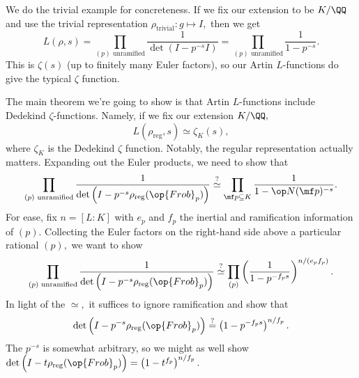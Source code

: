 We do the trivial example for concreteness. If we fix our extension to be $K/\QQ$ and use the trivial representation $\rho_{\text{trivial}}:g\mapsto I,$ then we get
\[L(\rho,s)=\prod_{(p)\text{ unramified}}\frac1{\det(I-p^{-s}I)}=\prod_{(p)\text{ unramified}}\frac1{1-p^{-s}}.\]
This is $\zeta(s)$ (up to finitely many Euler factors), so our Artin $L$-functions do give the typical $\zeta$ function.

The main theorem we're going to show is that Artin $L$-functions include Dedekind $\zeta$-functions. Namely, if we fix our extension $K/\QQ,$
\[L(\rho_{\text{reg}},s)\simeq\zeta_K(s),\]
where $\zeta_K$ is the Dedekind $\zeta$ function. Notably, the regular representation actually matters. Expanding out the Euler products, we need to show that
\[\prod_{(p)\text{ unramified}}\frac1{\det\left(I-p^{-s}\rho_{\text{reg}}(\op{Frob}_p)\right)}\stackrel?\simeq\prod_{\mf p\subseteq K}\frac1{1-\op N(\mf p)^{-s}}.\]
For ease, fix $n=[L:K]$ with $e_p$ and $f_p$ the inertial and ramification information of $(p).$ Collecting the Euler factors on the right-hand side above a particular rational $(p),$ we want to show
\[\prod_{(p)\text{ unramified}}\frac1{\det\left(I-p^{-s}\rho_{\text{reg}}(\op{Frob}_p)\right)}\stackrel?\simeq\prod_{(p)}\left(\frac1{1-p^{-f_ps}}\right)^{n/(e_pf_p)}.\]
In light of the $\simeq,$ it suffices to ignore ramification and show that
\[\det\left(I-p^{-s}\rho_{\text{reg}}(\op{Frob}_p)\right)\stackrel?=\left(1-p^{-f_ps}\right)^{n/f_p}.\]
The $p^{-s}$ is somewhat arbitrary, so we might as well show $\det\left(I-t\rho_{\text{reg}}(\op{Frob}_p)\right)=\left(1-t^{f_p}\right)^{n/f_p}.$

